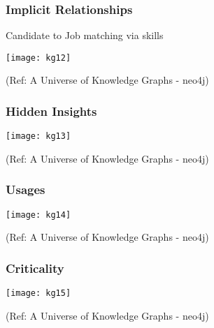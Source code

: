 \begin{frame}[fragile]\frametitle{Implicit Relationships}
 
	Candidate to Job matching via skills
 
			\begin{center}
			\texttt{[image: kg12]}
			\end{center}	
			
			{\tiny (Ref: A Universe of Knowledge Graphs - neo4j)}
		
	
\end{frame}

\begin{frame}[fragile]\frametitle{Hidden Insights}
 
 
			\begin{center}
			\texttt{[image: kg13]}
			\end{center}	
			
			{\tiny (Ref: A Universe of Knowledge Graphs - neo4j)}
		
	
\end{frame}

\begin{frame}[fragile]\frametitle{Usages}
 
 
			\begin{center}
			\texttt{[image: kg14]}
			\end{center}	
			
			{\tiny (Ref: A Universe of Knowledge Graphs - neo4j)}
		
	
\end{frame}

\begin{frame}[fragile]\frametitle{Criticality}
 
 
			\begin{center}
			\texttt{[image: kg15]}
			\end{center}	
			
			{\tiny (Ref: A Universe of Knowledge Graphs - neo4j)}
		
	
\end{frame}









